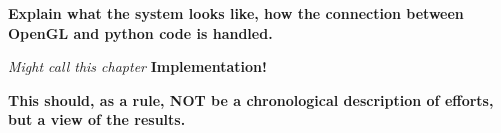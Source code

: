 \textbf{Explain what the system looks like, how the connection between OpenGL and python code is handled.}

\textit{Might call this chapter }\textbf{Implementation!}

\textbf{This should, as a rule, NOT be a chronological description of efforts, but a view of the results.}